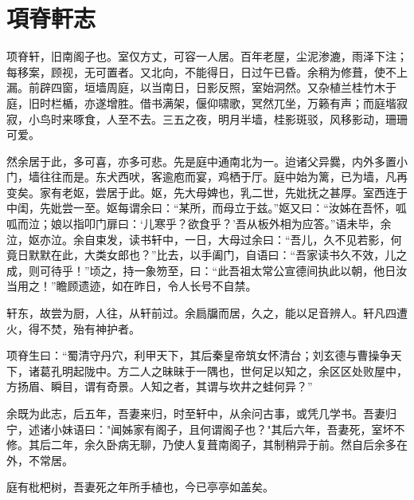 \section{ 項脊軒志}

项脊轩，旧南阁子也。室仅方丈，可容一人居。百年老屋，尘泥渗漉，雨泽下注；每移案，顾视，无可置者。又北向，不能得日，日过午已昏。余稍为修葺，使不上漏。前辟四窗，垣墙周庭，以当南日，日影反照，室始洞然。又杂植兰桂竹木于庭，旧时栏楯，亦遂增胜。借书满架，偃仰啸歌，冥然兀坐，万籁有声；而庭堦寂寂，小鸟时来啄食，人至不去。三五之夜，明月半墙，桂影斑驳，风移影动，珊珊可爱。

然余居于此，多可喜，亦多可悲。先是庭中通南北为一。迨诸父异爨，内外多置小门，墙往往而是。东犬西吠，客逾庖而宴，鸡栖于厅。庭中始为篱，已为墙，凡再变矣。家有老妪，尝居于此。妪，先大母婢也，乳二世，先妣抚之甚厚。室西连于中闺，先妣尝一至。妪每谓余曰：“某所，而母立于兹。”妪又曰：“汝姊在吾怀，呱呱而泣；娘以指叩门扉曰：‘儿寒乎？欲食乎？’吾从板外相为应答。”语未毕，余泣，妪亦泣。余自束发，读书轩中，一日，大母过余曰：“吾儿，久不见若影，何竟日默默在此，大类女郎也？”比去，以手阖门，自语曰：“吾家读书久不效，儿之成，则可待乎！”顷之，持一象笏至，曰：“此吾祖太常公宣德间执此以朝，他日汝当用之！”瞻顾遗迹，如在昨日，令人长号不自禁。

轩东，故尝为厨，人往，从轩前过。余扃牖而居，久之，能以足音辨人。轩凡四遭火，得不焚，殆有神护者。

项脊生曰：“蜀清守丹穴，利甲天下，其后秦皇帝筑女怀清台；刘玄德与曹操争天下，诸葛孔明起陇中。方二人之昧昧于一隅也，世何足以知之，余区区处败屋中，方扬眉、瞬目，谓有奇景。人知之者，其谓与坎井之蛙何异？”

余既为此志，后五年，吾妻来归，时至轩中，从余问古事，或凭几学书。吾妻归宁，述诸小妹语曰："闻姊家有阁子，且何谓阁子也？"其后六年，吾妻死，室坏不修。其后二年，余久卧病无聊，乃使人复葺南阁子，其制稍异于前。然自后余多在外，不常居。

庭有枇杷树，吾妻死之年所手植也，今已亭亭如盖矣。
